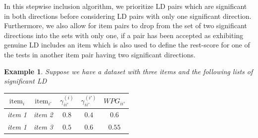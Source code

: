\documentclass[a4project,12pt]{article}
\theoremstyle{examplestyle}
\newtheorem{example}{Example}[section]
\theoremstyle{defstyle}
\theoremstyle{thmstyle}
\begin{document}
In this stepwise inclusion algorithm, we prioritize LD pairs which are significant in both directions before considering LD pairs with only one significant direction. Furthermore, we also allow for item pairs to drop from the set of two significant directions into the sets with only one, if a pair has been accepted as exhibiting genuine LD includes an item which is also used to define the rest-score for one of the tests in another item pair having two significant directions. 
\begin{mybox3}
    \begin{example}
        Suppose we have a dataset with three items and the following lists of significant LD

\begin{center}
\begin{tabular}{c c c c c}
\hline 
$\text{item}_i$ & $\text{item}_{i'}$ & $\gamma_{ii'}^{(i)}$ & $\gamma_{ii'}^{(i')}$ & $WPG_{ii'}$ \\
\hline
item 1 & item 2 & $0.8$ & $0.4$ & $0.6$  \\

item 1 & item 3 & $0.5$ & $0.6$ & $0.55$ \\
\hline
\end{tabular}
\label{tab:placeholder1}
\end{center}


\end{example}
\end{mybox3}
\end{document}
